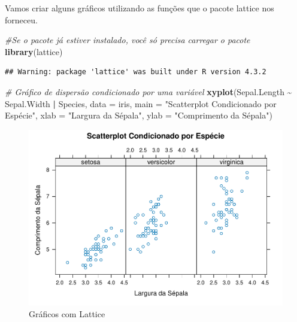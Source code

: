\documentclass[
]{book}
\newenvironment{Shaded}{\begin{snugshade}}{\end{snugshade}}
\newcommand{\AttributeTok}[1]{\textcolor[rgb]{0.13,0.29,0.53}{#1}}
\newcommand{\CommentTok}[1]{\textcolor[rgb]{0.56,0.35,0.01}{\textit{#1}}}
\newcommand{\FunctionTok}[1]{\textcolor[rgb]{0.13,0.29,0.53}{\textbf{#1}}}
\newcommand{\NormalTok}[1]{#1}
\newcommand{\SpecialCharTok}[1]{\textcolor[rgb]{0.81,0.36,0.00}{\textbf{#1}}}
\newcommand{\StringTok}[1]{\textcolor[rgb]{0.31,0.60,0.02}{#1}}
\begin{document}
Vamos criar alguns gráficos utilizando as funções que o pacote lattice nos forneceu.

\begin{Shaded}
\begin{Highlighting}[]
\CommentTok{\#Se o pacote já estiver instalado, você só precisa carregar o pacote}
\FunctionTok{library}\NormalTok{(lattice) }
\end{Highlighting}
\end{Shaded}

\begin{verbatim}
## Warning: package 'lattice' was built under R version 4.3.2
\end{verbatim}

\begin{Shaded}
\begin{Highlighting}[]
\CommentTok{\# Gráfico de dispersão condicionado por uma variável}
\FunctionTok{xyplot}\NormalTok{(Sepal.Length }\SpecialCharTok{\textasciitilde{}}\NormalTok{ Sepal.Width }\SpecialCharTok{|}\NormalTok{ Species, }\AttributeTok{data =}\NormalTok{ iris,}
       \AttributeTok{main =} \StringTok{"Scatterplot Condicionado por Espécie"}\NormalTok{,}
       \AttributeTok{xlab =} \StringTok{"Largura da Sépala"}\NormalTok{, }
       \AttributeTok{ylab =} \StringTok{"Comprimento da Sépala"}\NormalTok{)}
\end{Highlighting}
\end{Shaded}

\begin{figure}
\centering
\includegraphics{_main_files/figure-latex/nome-do-chunk-1.pdf}
\caption{\label{fig:nome-do-chunk-1}Gráficos com Lattice}
\end{figure}
\end{document}
